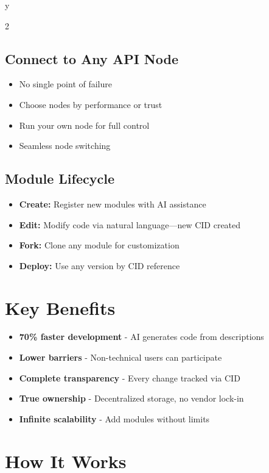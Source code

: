 y\documentclass[11pt,a4paper]{article}
\begin{document}
\begin{multicols}{2}
\subsection*{Connect to Any API Node}
\begin{itemize}
    \item No single point of failure
    \item Choose nodes by performance or trust
    \item Run your own node for full control
    \item Seamless node switching
\end{itemize}

\subsection*{Module Lifecycle}
\begin{itemize}
    \item \textbf{Create:} Register new modules with AI assistance
    \item \textbf{Edit:} Modify code via natural language—new CID created
    \item \textbf{Fork:} Clone any module for customization
    \item \textbf{Deploy:} Use any version by CID reference
\end{itemize}

\section*{\textcolor{primarycolor}{Key Benefits}}

\begin{itemize}
    \item \textbf{70\% faster development} - AI generates code from descriptions
    \item \textbf{Lower barriers} - Non-technical users can participate
    \item \textbf{Complete transparency} - Every change tracked via CID
    \item \textbf{True ownership} - Decentralized storage, no vendor lock-in
    \item \textbf{Infinite scalability} - Add modules without limits
\end{itemize}

\columnbreak

\section*{\textcolor{primarycolor}{How It Works}}


\end{multicols}
\end{document}

